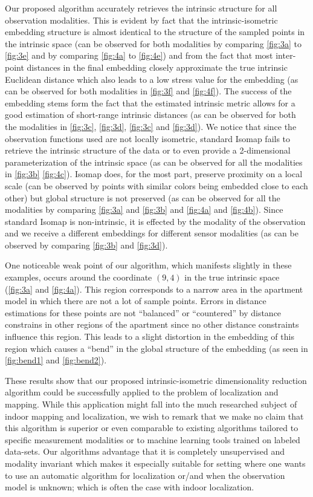 	Our proposed algorithm accurately retrieves the intrinsic structure for all observation modalities. This is evident by fact that the intrinsic-isometric embedding structure is almost identical to the structure of the sampled points in the intrinsic space (can be observed for both modalities by comparing \cref{fig:3a} to \cref{fig:3e} and by comparing \cref{fig:4a} to \cref{fig:4e}) and from the fact that most inter-point distances in the final embedding closely approximate the true intrinsic Euclidean distance which also leads to a low stress value for the embedding (as can be observed for both modalities in \cref{fig:3f} and \cref{fig:4f}). The success of the embedding stems form the fact that the estimated intrinsic metric allows for a good estimation of short-range intrinsic distances (as can be observed for both the modalities in \cref{fig:3c}, \cref{fig:3d}, \cref{fig:3c} and \cref{fig:3d}). We notice that since the observation functions used are not locally isometric, standard Isomap fails to retrieve the intrinsic structure of the data or to even provide a 2-dimensional parameterization of the intrinsic space (as can be observed for all the modalities in \cref{fig:3b} \cref{fig:4c}). Isomap does, for the most part, preserve proximity on a local scale (can be observed by points with similar colors being embedded close to each other) but global structure is not preserved (as can be observed for all the modalities by comparing \cref{fig:3a} and \cref{fig:3b} and \cref{fig:4a} and \cref{fig:4b}). Since standard Isomap is non-intrinsic, it is effected by the modality of the observation and we receive a different embeddings for different sensor modalities (as can be observed by comparing \cref{fig:3b} and \cref{fig:3d}).
	
	One noticeable weak point of our algorithm, which manifests slightly in these examples, occurs around the coordinate $\left(9,4\right)$ in the true intrinsic space (\cref{fig:3a} and \cref{fig:4a}). This region corresponds to a narrow area in the apartment model in which there are not a lot of sample points. Errors in distance estimations for these points are not ``balanced'' or ``countered'' by distance constrains in other regions of the apartment since no other distance constraints influence this region. This leads to a slight distortion in the embedding of this region which causes a ``bend'' in the global structure of the embedding (as seen in \cref{fig:bend1} and \cref{fig:bend2}).
	
	These results show that our proposed intrinsic-isometric dimensionality reduction algorithm could be successfully applied to the problem of localization and mapping. While this application might fall into the much researched subject of indoor mapping and localization, we wish to remark that we make no claim that this algorithm is superior or even comparable to existing algorithms tailored to specific measurement modalities or to machine learning tools trained on labeled data-sets. Our algorithms advantage that it is completely unsupervised and modality invariant which makes it especially suitable for setting where one wants to use an automatic algorithm for localization or/and when the observation model is unknown; which is often the case with indoor localization.

	